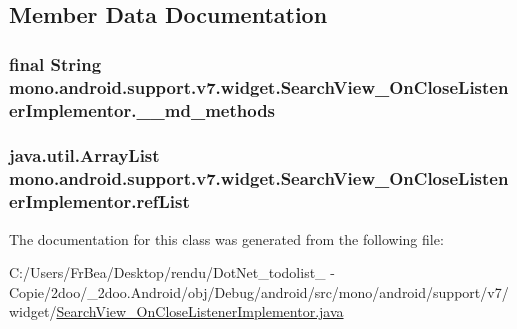 \subsection{Member Data Documentation}
\hypertarget{classmono_1_1android_1_1support_1_1v7_1_1widget_1_1_search_view___on_close_listener_implementor_de24b40287e42469422f6653a871f026}{
\subsubsection[{\_\-\_\-md\_\-methods}]{\setlength{\rightskip}{0pt plus 5cm}final String {\bf mono.android.support.v7.widget.SearchView\_\-OnCloseListenerImplementor.\_\-\_\-md\_\-methods}}}
\label{classmono_1_1android_1_1support_1_1v7_1_1widget_1_1_search_view___on_close_listener_implementor_de24b40287e42469422f6653a871f026}


\hypertarget{classmono_1_1android_1_1support_1_1v7_1_1widget_1_1_search_view___on_close_listener_implementor_35e6cb831c68d443c37e7c8e9ff910d5}{
\subsubsection[{refList}]{\setlength{\rightskip}{0pt plus 5cm}java.util.ArrayList {\bf mono.android.support.v7.widget.SearchView\_\-OnCloseListenerImplementor.refList}}}
\label{classmono_1_1android_1_1support_1_1v7_1_1widget_1_1_search_view___on_close_listener_implementor_35e6cb831c68d443c37e7c8e9ff910d5}




The documentation for this class was generated from the following file:\begin{CompactItemize}
\item 
C:/Users/FrBea/Desktop/rendu/DotNet\_\-todolist\_ - Copie/2doo/\_\-2doo.Android/obj/Debug/android/src/mono/android/support/v7/widget/\hyperlink{_search_view___on_close_listener_implementor_8java}{SearchView\_\-OnCloseListenerImplementor.java}\end{CompactItemize}
